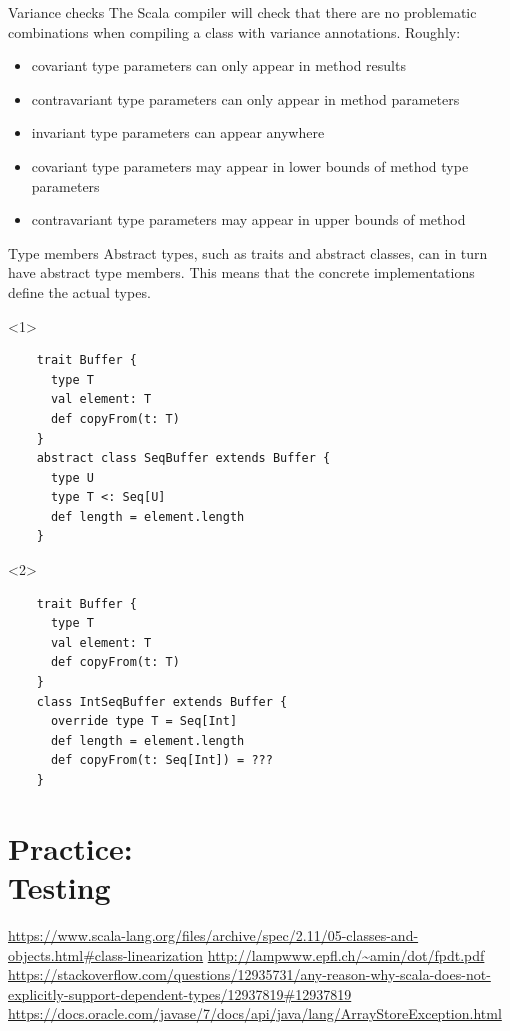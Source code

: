 \documentclass[aspectratio=169]{beamer}
\begin{document}
\begin{frame}[fragile]{Variance checks}
The Scala compiler will check that there are no problematic combinations when compiling a class with
variance annotations. Roughly:
\begin{itemize}
  \item covariant type parameters can only appear in method results
  \item contravariant type parameters can only appear in method parameters
  \item invariant type parameters can appear anywhere
    \pause
  \item covariant type parameters may appear in lower bounds of method type parameters
  \item contravariant type parameters may appear in upper bounds of method
\end{itemize}
\end{frame}

\begin{frame}[fragile]{Type members}
  Abstract types, such as traits and abstract classes, can in turn have abstract type members. This
  means that the concrete implementations define the actual types.
  \begin{onlyenv}<1>
      \begin{verbatim}
    trait Buffer {
      type T
      val element: T
      def copyFrom(t: T)
    }
    abstract class SeqBuffer extends Buffer {
      type U
      type T <: Seq[U]
      def length = element.length
    }
      \end{verbatim}
  \end{onlyenv}
  \begin{onlyenv}<2>
      \begin{verbatim}
    trait Buffer {
      type T
      val element: T
      def copyFrom(t: T)
    }
    class IntSeqBuffer extends Buffer {
      override type T = Seq[Int]
      def length = element.length
      def copyFrom(t: Seq[Int]) = ???
    }
      \end{verbatim}
  \end{onlyenv}
\end{frame}



\section{Practice: \\ Testing}

\begin{thebibliography}{9}
  \url{https://www.scala-lang.org/files/archive/spec/2.11/05-classes-and-objects.html#class-linearization}
  \url{http://lampwww.epfl.ch/~amin/dot/fpdt.pdf}
  \url{https://stackoverflow.com/questions/12935731/any-reason-why-scala-does-not-explicitly-support-dependent-types/12937819#12937819}
  \url{https://docs.oracle.com/javase/7/docs/api/java/lang/ArrayStoreException.html}
\end{thebibliography}
\end{document}
